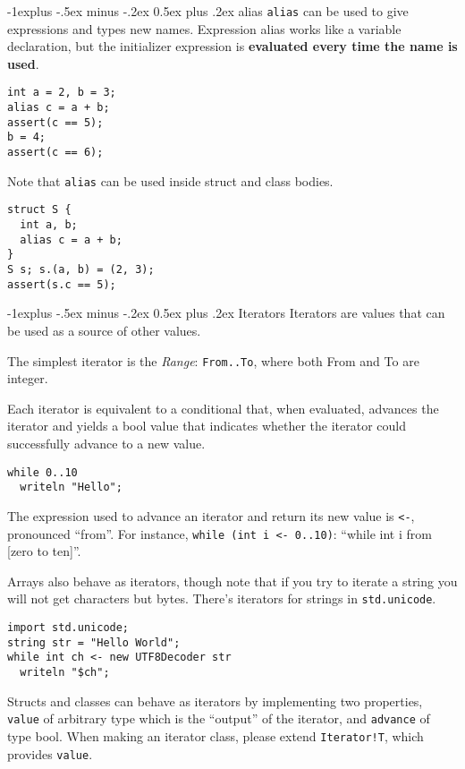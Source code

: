 \documentclass[a4paper,10pt,landscape]{article}
\makeatletter
\newenvironment{segment}[1]
{\begin{mdframed}[roundcorner=5pt]\subsection{#1}}
{\end{mdframed}\vspace{2pt plus 5pt}}
\newcommand{\important}[1]{\textbf{#1}}
\renewcommand{\subsection}{\@startsection{subsection}{2}{0mm}%
			      {-1explus -.5ex minus -.2ex}%
			      {0.5ex plus .2ex}%
			      {\normalfont\normalsize\bfseries}}
\makeatother
\begin{document}
\begin{multicols}{3}
\begin{segment}{alias}
\texttt{alias} can be used to give expressions and types new names. Expression alias works like
a variable declaration, but the initializer expression is \important{evaluated every time the name is used}.
\begin{lstlisting}
int a = 2, b = 3;
alias c = a + b;
assert(c == 5);
b = 4;
assert(c == 6);
\end{lstlisting}
Note that \texttt{alias} can be used inside struct and class bodies.
\begin{lstlisting}
struct S {
  int a, b;
  alias c = a + b;
}
S s; s.(a, b) = (2, 3);
assert(s.c == 5);
\end{lstlisting}
\end{segment}

\begin{segment}{Iterators}
Iterators are values that can be used as a source of other values.

The simplest iterator is the \emph{Range}: \texttt{From..To}, where both From and To are integer.

Each iterator is equivalent to a conditional that, when evaluated, advances the iterator and yields
a bool value that indicates whether the iterator could successfully advance to a new value.

\begin{lstlisting}
while 0..10
  writeln "Hello";
\end{lstlisting}

The expression used to advance an iterator and return its new value is \texttt{<-}, pronounced
\enquote{from}. For instance, \texttt{while (int i <- 0..10)}: \enquote{while int i from [zero to ten]}.

Arrays also behave as iterators, though note that if you try to iterate a string you will not get characters but bytes.
There's iterators for strings in \texttt{std.unicode}.

\begin{lstlisting}
import std.unicode;
string str = "Hello World";
while int ch <- new UTF8Decoder str
  writeln "$ch";
\end{lstlisting}

Structs and classes can behave as iterators by implementing two properties, \texttt{value}
of arbitrary type which is the \enquote{output} of the iterator, and \texttt{advance} of
type bool. When making an iterator class, please extend \texttt{Iterator!T}, which provides \texttt{value}.


\end{segment}
\end{multicols}
\end{document}
